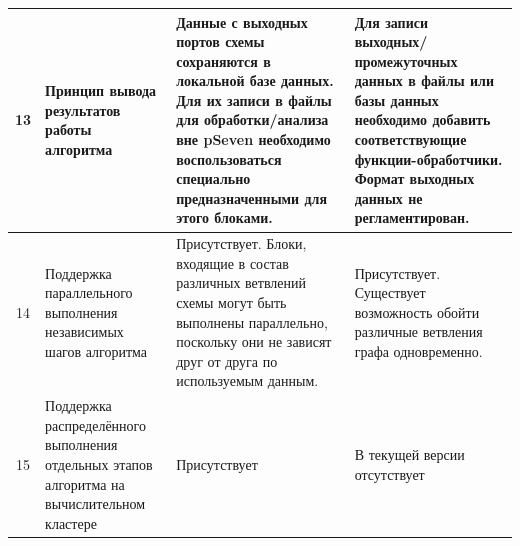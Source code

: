 \begin{landscape}
\begin{longtable}{|c|p{}|p{}|p{}|}
    \hline
    13         & Принцип вывода результатов работы алгоритма                                                & Данные с выходных портов схемы сохраняются в локальной базе данных. Для их записи в файлы для обработки/анализа вне pSeven необходимо воспользоваться специально предназначенными для этого блоками.                                                                                                                                                                                                                                                                                                                                                                                                                                                              & Для записи выходных/промежуточных данных в файлы или базы данных необходимо добавить соответствующие функции-обработчики. Формат выходных данных не регламентирован.                                                                                                              \\
    \hline
    14         & Поддержка параллельного выполнения независимых шагов алгоритма                             & Присутствует. Блоки, входящие в состав различных ветвлений схемы могут быть выполнены параллельно, поскольку они не зависят друг от друга по используемым данным.                                                                                                                                                                                                                                                                                                                                                                                                                                                                                                 & Присутствует. Существует возможность обойти различные ветвления графа одновременно.                                                                                                                                                                                               \\
    \hline
    15         & Поддержка распределённого выполнения отдельных этапов алгоритма на вычислительном кластере & Присутствует                                                                                                                                                                                                                                                                                                                                                                                                                                                                                                                                                                                                                                                      & В текущей версии отсутствует                                                                                                                                                                                                                                                      \\

\end{longtable}
\end{landscape}
